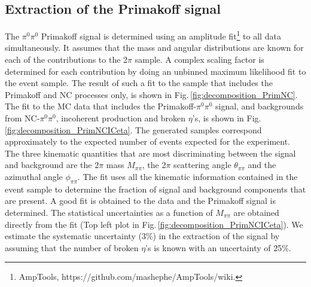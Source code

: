 \subsection{Extraction of the Primakoff signal \label{sec:signalfit}}
The $\pi^0\pi^0$ Primakoff signal is determined using an amplitude fit\footnote{AmpTools, https://github.com/mashephe/AmpTools/wiki.} to all data simultaneously. It assumes that the mass and angular distributions are known for each of the contributions to the 2$\pi$ sample. A complex scaling factor is determined for each contribution by doing an unbinned maximum likelihood fit to the event sample. The result of such a fit to the sample that includes the Primakoff and NC processes only, is shown in  Fig.\,\ref{fig:decomposition_PrimNC}. The fit to the MC data that includes the Primakoff-$\pi^0\pi^0$ signal, and backgrounds from NC-$\pi^0\pi^0$, incoherent production and broken $\eta$'s, is shown in Fig.\,\ref{fig:decomposition_PrimNCICeta}. The generated samples correspond approximately to the expected number of events expected for the experiment. The three kinematic quantities that are most discriminating between the signal and background are the 2$\pi$ mass $M_{\pi\pi}$, the 2$\pi$ scattering angle $\theta_{\pi\pi}$ and the azimuthal angle $\phi_{\pi\pi}$. The fit uses all the kinematic information contained in the event sample to determine the fraction of signal and background components that are present. A good fit is obtained to the data and the Primakoff signal is determined. The statistical uncertainties as a function of $M_{\pi\pi}$ are obtained directly from the fit (Top left plot in Fig.\,\ref{fig:decomposition_PrimNCICeta}). We estimate the systematic uncertainty (3\%) in the extraction of the signal by
assuming that the number of broken $\eta$'s is known with an uncertainty of 25\%.

